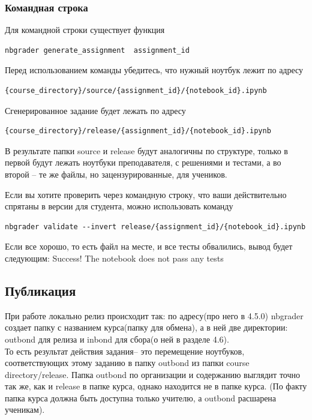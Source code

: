 \documentclass[a4paper,12pt]{article}
\begin{document}
\subsubsection{Командная строка}

Для командной строки существует функция 
\begin{verbatim}
nbgrader generate_assignment  assignment_id
\end{verbatim}

Перед использованием команды убедитесь, что нужный ноутбук лежит по адресу 
\begin{verbatim}
{course_directory}/source/{assignment_id}/{notebook_id}.ipynb
\end{verbatim}

Сгенерированное задание будет лежать по адресу
\begin{verbatim}
{course_directory}/release/{assignment_id}/{notebook_id}.ipynb
\end{verbatim}

В результате папки source и release будут аналогичны по структуре, только в первой будут лежать ноутбуки преподавателя, с решениями и тестами, а во второй -- те же файлы, но зацензурированные, для учеников.

Если вы хотите проверить через командную строку, что ваши действительно спрятаны в версии для студента, можно использовать команду
\begin{verbatim}
nbgrader validate --invert release/{assignment_id}/{notebook_id}.ipynb
\end{verbatim}

Если все хорошо, то есть файл на месте, и все тесты обвалились, вывод будет следующим:
\grqq Success! The notebook does not pass any tests\grqq

\subsection{Публикация}

При работе локально релиз происходит так: по адресу(про него в 4.5.0) nbgrader создает папку с названием курса(папку для обмена), а в ней две директории: outbond для релиза и inbond для сбора(о ней в разделе 4.6). \\То есть результат действия  задания\grqq -- это перемещение ноутбуков, соответствующих этому заданию в папку outbond из папки course\underline{ }directory/release.
Папка outbond по организации и содержанию выглядит точно так же, как и release в папке курса, однако находится не в папке курса. (По факту папка курса должна быть доступна только учителю, а outbond расшарена ученикам).
\end{document}
